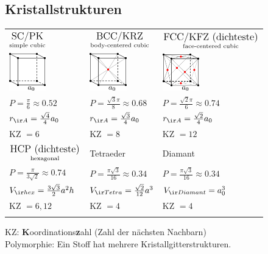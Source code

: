 \documentclass[fs, footer]{latex4ei}
\begin{document}
\begin{multicols*}{4}
{	\subsection{Kristallstrukturen}
\begin{tabular*}{\columnwidth}{@{\extracolsep\fill}lll@{}}
	$\underset{\text{simple cubic}}{\text{\large SC/PK}}$ & $\underset{\text{body-centered cubic}}{\text{\large BCC/KRZ}}$ & $\underset{\text{face-centered cubic}}{\text{\large FCC/KFZ (dichteste)}}$\\ \mrule
	\includegraphics[width = 1.6cm]{./img/sc.pdf} & \includegraphics[width = 1.6cm]{./img/bcc.pdf} & \includegraphics[width = 1.6cm]{./img/fcc.pdf}\\
	$P = \frac{\pi}{6} \approx 0.52$ & $P = \frac{\sqrt{3}\pi}{8} \approx 0.68$ & $P = \frac{\sqrt{2}\pi}{6} \approx 0.74$\\[0.5em]
	$r_{\ir A} = \frac{\sqrt{4}}{4} a_0$ & $r_{\ir A} = \frac{\sqrt{3}}{4} a_0$ & $r_{\ir A} = \frac{\sqrt{2}}{4} a_0$\\[0.5em]
	KZ $=6$ & KZ $=8$ & KZ $=12$\\

	$\underset{\text{hexagonal}}{\text{\large HCP (dichteste)}}$ & \large Tetraeder & \large Diamant\\ \mrule
	$P = \frac{\pi}{3 \sqrt{2}} \approx 0.74$ & $P = \frac{\pi \sqrt{3}}{16} \approx 0.34$ & $P = \frac{\pi \sqrt{3}}{16} \approx 0.34$\\
	$V_{\ir hex} = \frac{3\sqrt{3}}{2} a^2 h$ & $V_{\ir Tetra} = \frac{\sqrt{2}}{12}a^3$ & $V_{\ir Diamant} = a_0^3$\\
	KZ $=6,12$ & KZ $=4$ & KZ $=4$\\ \\
\end{tabular*}
	 KZ: \textbf{K}oordinations\textbf{z}ahl (Zahl der nächsten Nachbarn)\\
	 Polymorphie: Ein Stoff hat mehrere Kristallgitterstrukturen.\\
}


\end{multicols*}
\end{document}
